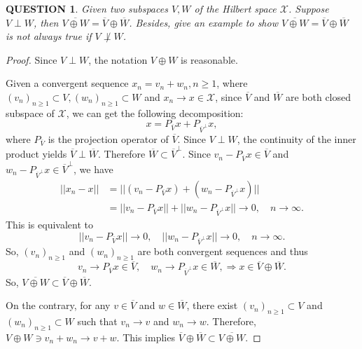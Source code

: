 \documentclass[12pt]{article}
\renewcommand{\(}{\left(}%
\renewcommand{\)}{\right)}%
\renewcommand{\[}{\left[}%
\renewcommand{\]}{\right]}%
\newcommand{\x}{\mathscr{X}}
\newtheorem{question}{QUESTION}[section]}
\newtheorem{proof}{Proof.}}
\begin{document}
  \begin{question}
  	Given two subspaces $V,W$ of the Hilbert space $\x$. Suppose $V\perp W$, then $\overline{V\oplus W}=\overline{V}\oplus \overline{W}$. Besides, give an example to show $\overline{V\oplus W}=\overline{V}\oplus \overline{W}$ is not always true if $V\not\perp W$. 
  \end{question}
  \begin{proof}
  	Since $V\perp W$, the notation $V\oplus W$ is reasonable.
  	
  	Given a convergent sequence $x_n=v_n+w_n,n\geq 1$, where $(v_n)_{n\geq 1}\subset V,(w_n)_{n\geq 1}\subset W$ and $x_n\to x\in \x$, since $\overline{V}$ and $\overline{W}$ are both closed subspace of $\x$, we can get the following decomposition:
  	\begin{equation*}
  		x=P_{\overline{V}}x+P_{\overline{V}^\perp}x,
  	\end{equation*} 
  	where $P_{\overline{V}}$ is the projection operator of $\overline{V}$. Since $V\perp W$, the continuity of the inner product yields $\overline{ V}\perp\overline{ W}$. Therefore $\overline{W}\subset \overline{V}^\perp$. Since $v_n-P_{\overline{V}}x\in \overline{V}$ and $w_n-P_{\overline{V}^\perp}x \in \overline{V}^\perp$, we have
  	\begin{equation*}
  		\begin{split}
  			||x_n-x||&=||(v_n-P_{\overline{V}}x)+(w_n-P_{\overline{V}^\perp}x)||\\
  			&=||v_n-P_{\overline{V}}x||+||w_n-P_{\overline{V}^\perp}x||\to 0,\quad n\to\infty.
  		\end{split}
  	\end{equation*}
  	This is equivalent to
  	\begin{equation*}
  		||v_n-P_{\overline{V}}x||\to0,\quad ||w_n-P_{\overline{V}^\perp}x||\to 0,\quad n\to\infty.
  	\end{equation*}
  	So, $(v_n)_{n\geq 1}$ and $(w_n)_{n\geq 1}$ are both convergent sequences and thus 
  	\begin{equation*}
  		v_n\to P_{\overline{V}}x\in \overline{V},\quad w_n\to P_{\overline{V}^\perp}x\in \overline{W},\Longrightarrow x\in \overline{V}\oplus \overline{W}.
  	\end{equation*}
  	So, $\overline{V\oplus W}\subset\overline{V}\oplus \overline{W}$. 
  	
  	On the contrary, for any $v\in \overline{V}$ and $w\in\overline{W}$, there exist $(v_n)_{n\geq 1}\subset V$ and $(w_n)_{n\geq 1}\subset W$ such that $v_n\to v$ and $w_n\to w$. Therefore, $V\oplus W\ni v_n+w_n\to v+w$. This implies $\overline{V}\oplus \overline{W}\subset \overline{V\oplus W}$.
  	

\end{proof}
\end{document}
